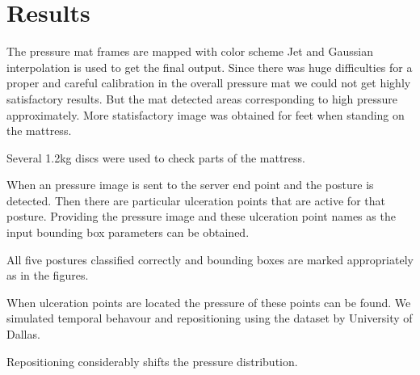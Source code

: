 \chapter{Results}
\label{chapter:results}



 

The pressure mat frames are mapped with color scheme Jet and Gaussian interpolation is used to get the final output. Since there was huge difficulties for a proper and careful calibration in the overall pressure mat we could not get highly satisfactory results. But the mat detected areas corresponding to high pressure approximately. More statisfactory image was obtained for feet when standing on the mattress. 

Several 1.2kg discs were used to check parts of the mattress.

When an pressure image is sent to the server end point and the posture is detected. Then there are particular ulceration points that are active for that posture. Providing the pressure image and these ulceration point names as the input bounding box parameters can be obtained.

All five postures classified correctly and bounding boxes are marked appropriately as in the figures.

When ulceration points are located the pressure of these points can be found. We simulated temporal behavour and repositioning using the dataset by University of Dallas.

Repositioning considerably shifts the pressure distribution. 




